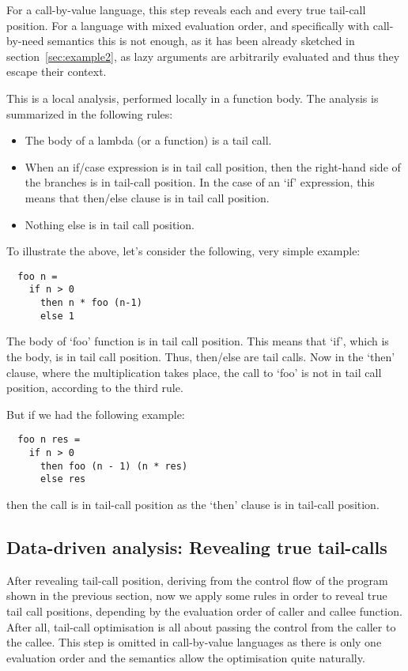 \documentclass[diploma]{softlab-thesis}
\begin{document}
For a call-by-value language, this step reveals each and every true tail-call position. For a language with mixed evaluation order, and specifically 
with call-by-need semantics this is not enough, as it has been already sketched in section~\ref{sec:example2}, as lazy arguments are arbitrarily evaluated and thus 
they escape their context. 

This is a local analysis, performed locally in a function body. The analysis is summarized in the following rules:
\begin{itemize}
  \item The body of a lambda (or a function) is a tail call.
  \item When an if/case expression is in tail call position, then the right-hand side of the branches is in tail-call position. 
  In the case of an `if' expression, this means that then/else clause is in tail call position.
  \item Nothing else is in tail call position.
\end{itemize}

To illustrate the above, let's consider the following, very simple example:
\begin{verbatim}
  foo n = 
    if n > 0  
      then n * foo (n-1) 
      else 1
\end{verbatim}

The body of `foo' function is in tail call position. This means that `if', which is the body, is in tail call position. 
Thus, then/else are tail calls. Now in the `then' clause, where the multiplication takes place, the call to `foo' is not in tail call position, 
according to the third rule.

But if we had the following example:
\begin{verbatim}
  foo n res = 
    if n > 0 
      then foo (n - 1) (n * res)
      else res
\end{verbatim}
then the call is in tail-call position as the `then' clause is in tail-call position.

\subsection{Data-driven analysis: Revealing true tail-calls}
\label{sec:data-driven-analysis}

After revealing tail-call position, deriving from the control flow of the program shown in the previous section, now we apply some rules in order to 
reveal true tail call positions, depending by the evaluation order of caller and callee function. After all, tail-call optimisation 
is all about passing the control from the caller to the callee. This step is omitted in call-by-value languages as there is 
only one evaluation order and the semantics allow the optimisation quite naturally.
\end{document}
